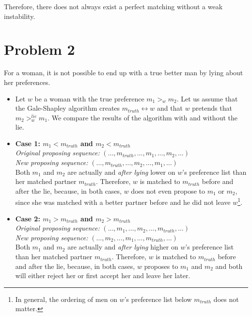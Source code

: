 \documentclass[12pt]{article}
\begin{document}
Therefore, there does not always exist a perfect matching without a weak instability.

\section*{Problem 2}
For a woman, it is not possible to end up with a true better man by lying about her preferences.

\begin{itemize}
	\item Let $w$ be a woman with the true preference $m_1 >_w m_2$. Let us assume that the Gale-Shapley algorithm creates $m_{\mathit{truth}} \leftrightarrow w$ and that $w$ pretends that $m_2 >_w^{\mathit{lie}} m_1$. We compare the results of the algorithm with and without the lie. \\
	\item \textbf{Case 1: $m_1 < m_{\mathit{truth}}$ and $m_2 < m_{\mathit{truth}}$} \\ 
\emph{Original proposing sequence:} $(\ldots, m_{\mathit{truth}}, \ldots, m_1, \ldots, m_2, \ldots)$ \\
\emph{New proposing sequence:} $(\ldots, m_{\mathit{truth}}, \ldots, m_2, \ldots, m_1, \ldots)$ \\
Both $m_1$ and $m_2$ are actually and \emph{after lying} lower on $w$'s preference list than her matched partner $m_{\mathit{truth}}$. Therefore, $w$ is matched to $m_{\mathit{truth}}$ before and after the lie, because, in both cases, $w$ does not even propose to $m_1$ or $m_2$, since she was matched with a better partner before and he did not leave $w$\footnote{In general, the ordering of men on $w$'s preference list below $m_{\mathit{truth}}$ does not matter.}.
	\item \textbf{Case 2: $m_1 > m_{\mathit{truth}}$ and $m_2 > m_{\mathit{truth}}$} \\ 
\emph{Original proposing sequence:} $(\ldots, m_1, \ldots, m_2, \ldots, m_{\mathit{truth}}, \ldots)$ \\
\emph{New proposing sequence:} $(\ldots, m_2, \ldots, m_1, \ldots, m_{\mathit{truth}}, \ldots)$ \\
Both $m_1$ and $m_2$ are actually and \emph{after lying} higher on $w$'s preference list than her matched partner $m_{\mathit{truth}}$. Therefore, $w$ is matched to $m_{\mathit{truth}}$ before and after the lie, because, in both cases, $w$ proposes to $m_1$ and $m_2$ and both will either reject her or first accept her and leave her later. \begin{itemize}

\end{itemize}
\end{itemize}
\end{document}
